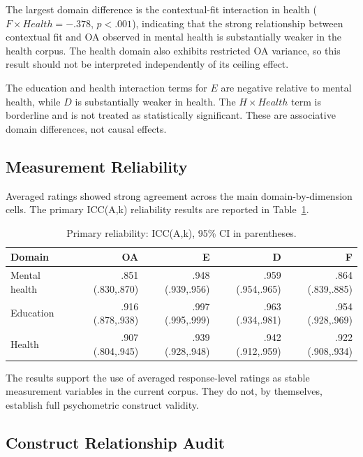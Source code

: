 \documentclass[manuscript,review,anonymous]{acmart}
\begin{document}
The largest domain difference is the contextual-fit interaction in health ($F\times Health=-.378$, $p<.001$), indicating that the strong relationship between contextual fit and OA observed in mental health is substantially weaker in the health corpus. The health domain also exhibits restricted OA variance, so this result should not be interpreted independently of its ceiling effect.

The education and health interaction terms for $E$ are negative relative to mental health, while $D$ is substantially weaker in health. The $H\times Health$ term is borderline and is not treated as statistically significant. These are associative domain differences, not causal effects.

\subsection{Measurement Reliability}

Averaged ratings showed strong agreement across the main domain-by-dimension cells. The primary ICC(A,k) reliability results are reported in Table~\ref{tab:reliability}.

\begin{table}[t]
\centering
\caption{Primary reliability: ICC(A,k), 95\% CI in parentheses.}
\label{tab:reliability}
\begin{tabular}{lrrrr}
\toprule
Domain & OA & E & D & F\\
\midrule
Mental health & .851 (.830,.870) & .948 (.939,.956) & .959 (.954,.965) & .864 (.839,.885)\\
Education & .916 (.878,.938) & .997 (.995,.999) & .963 (.934,.981) & .954 (.928,.969)\\
Health & .907 (.804,.945) & .939 (.928,.948) & .942 (.912,.959) & .922 (.908,.934)\\
\bottomrule
\end{tabular}
\end{table}

The results support the use of averaged response-level ratings as stable measurement variables in the current corpus. They do not, by themselves, establish full psychometric construct validity.

\subsection{Construct Relationship Audit}
\end{document}
